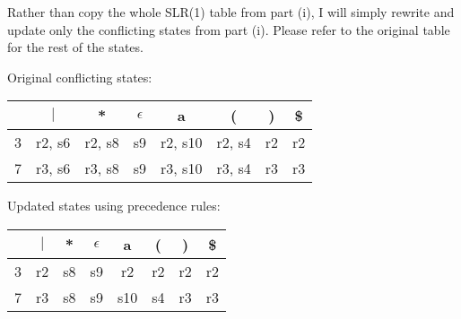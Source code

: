 \documentclass{article}
\begin{document}
\begin{enumerate}[i.]
		Rather than copy the whole SLR(1) table from part (i), I will
		simply rewrite and update only the conflicting states from part
		(i). Please refer to the original table for the rest of the
		states.

		Original conflicting states:

		\begin{tabular}{|c|c|c|c|c|c|c|c|}
			                                                                     \hline
			   &  $|$   &  *     & $\epsilon$ &   a      &  (     &   ) &  \$ \\ \hline
			3  & r2, s6 & r2, s8 &     s9     &  r2, s10 & r2, s4 &  r2 &  r2 \\ \hline
			7  & r3, s6 & r3, s8 &     s9     &  r3, s10 & r3, s4 &  r3 &  r3 \\ \hline
		\end{tabular}

		Updated states using precedence rules:

		\begin{tabular}{|c|c|c|c|c|c|c|c|}
			                                                                     \hline
			   & $|$ &  * & $\epsilon$ &   a &  ( &  ) & \$ \\ \hline
			3  &  r2 & s8 &     s9     &  r2 & r2 & r2 & r2 \\ \hline
			7  &  r3 & s8 &     s9     & s10 & s4 & r3 & r3 \\ \hline
		\end{tabular}
\end{enumerate}
\end{document}
